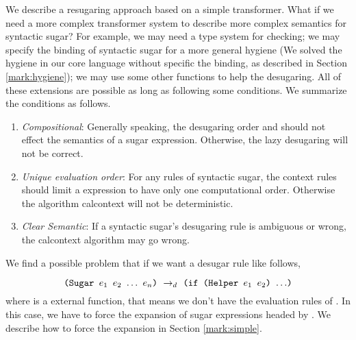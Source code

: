 We describe a resugaring approach based on a simple transformer. What if we need a more complex transformer system to describe more complex semantics for syntactic sugar? For example, we may need a type system for checking; we may specify the binding of syntactic sugar for a more general hygiene (We solved the hygiene in our core language without specific the binding, as described in Section \ref{mark:hygiene}); we may use some other functions to help the desugaring. All of these extensions are possible as long as following some conditions. We summarize the conditions as follows.
\begin{enumerate}
	\item \emph{Compositional}: Generally speaking, the desugaring order and should not effect the semantics of a sugar expression. Otherwise, the lazy desugaring will not be correct.
	\item \emph{Unique evaluation order}: For any rules of syntactic sugar, the context rules should limit a expression to have only one computational order. Otherwise the algorithm calcontext will not be deterministic.
	\item \emph{Clear Semantic}: If a syntactic sugar's desugaring rule is ambiguous or wrong, the calcontext algorithm may go wrong.
\end{enumerate}

We find a possible problem that if we want a desugar rule like follows,

\[
\texttt{(Sugar $e_1$ $e_2$ $\ldots$ $e_n$)} ~\rightarrow_d~ \texttt{(if (Helper $e_1$ $e_2$) $\ldots$)}
\]
where  is a external function, that means we don't have the evaluation rules of . In this case, we have to force the expansion of sugar expressions headed by . We describe how to force the expansion in Section \ref{mark:simple}.